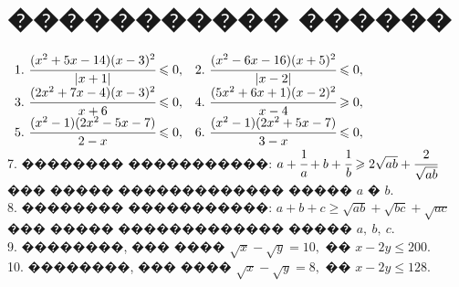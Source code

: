 \documentclass[12pt]{article}
\begin{document}
\section{����������� ������}
$\begin{array}{ll}
1.\ \cfrac{(x^2+5x-14)(x-3)^2}{|x+1|}\leqslant0,&
2.\ \cfrac{(x^2-6x-16)(x+5)^2}{|x-2|}\leqslant0,\\
3.\ \cfrac{(2x^2+7x-4)(x-3)^2}{x+6}\leqslant0,&
4.\ \cfrac{(5x^2+6x+1)(x-2)^2}{x-4}\geqslant0,\\
5.\ \cfrac{(x^2-1)(2x^2-5x-7)}{2-x}\leqslant0,&
6.\ \cfrac{(x^2-1)(2x^2+5x-7)}{3-x}\leqslant0,
\end{array}$\\
7. �������� �����������: $a+\cfrac{1}{a}+b+\cfrac{1}{b}\geqslant2\sqrt{ab}+\cfrac{2}{\sqrt{ab}}$ ��� ����� ������������� ����� $a$ � $b.$\\
8. �������� �����������: $a+b+c\geqslant\sqrt{ab}+\sqrt{bc}+\sqrt{ac}$ ��� ����� ������������� ����� $a,\ b,\ c.$\\
9. ��������, ��� ���� $\sqrt{x}-\sqrt{y}=10,$ �� $x-2y\leqslant 200.$\\
10. ��������, ��� ���� $\sqrt{x}-\sqrt{y}=8,$ �� $x-2y\leqslant128.$\\
\end{document}
